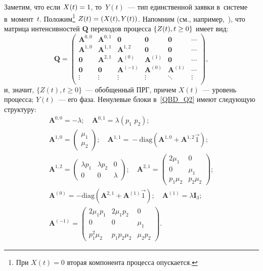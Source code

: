 \begin{multicols}{2}
 Заметим, что если $X(t)\hm=1$, то~$Y(t)$~--- 
тип единственной заявки в~сис\-те\-ме в~момент~$t$. Положим\footnote[1]{При $X(t)=0$ вторая компонента процесса 
опускается.} ${Z}(t)\hm=({X}(t),{Y}(t))$. Напомним
(см., например,~\cite{threel}), что мат\-ри\-ца интенсивностей
$\mathbf{Q}$ переходов процесса $\{{Z}(t), t \hm\ge 0\}$ имеет вид:
\begin{equation}
\mathbf{Q} =
\begin{pmatrix}
\mathbf{A}^{0,0} &  \mathbf{A}^{0,1}  & \mathbf{0} & \mathbf{0} & \mathbf{0}   & \cdots\\
\mathbf{A}^{1,0}  & \mathbf{A}^{1,1} & \mathbf{A}^{1,2}  & \mathbf{0} & \mathbf{0} &    \cdots\\
\mathbf{0} & \mathbf{A}^{2,1}  &  \mathbf{A}^{(0)}  & \mathbf{A}^{(1)} & \mathbf{0}  & \cdots\\
\mathbf{0} & \mathbf{0} & \mathbf{A}^{(-1)} & \mathbf{A}^{(0)} & \mathbf{A}^{(1)}  & \cdots\\
\vdots & \vdots & \vdots& \vdots& \ddots&  \vdots\\
\end{pmatrix},
\label{QBD_Q2}
\end{equation}
 и, значит, $\{{Z}(t), t \ge 0\}$~--- обобщенный ПРГ,
причем ${X}(t)$~--- уровень процесса; ${Y}(t)$~--- его фаза.
Ненулевые блоки в~\eqref{QBD_Q2} имеют сле\-ду\-ющую структуру:
\begin{gather*}
\mathbf{A}^{0,0}=-\lambda; \quad \mathbf{A}^{0,1}=\lambda (p_1 \,\, p_2 );\\
\mathbf{A}^{1,0} =
\begin{pmatrix}
\mu_1 \\
\mu_2
\end{pmatrix};
\quad
\mathbf{A}^{1,1} \!=\!
-\mathrm{diag} \left ( \mathbf{A}^{1,0} \!+\! \mathbf{A}^{1,2} {\vec 1} \right );
\\
\mathbf{A}^{1,2}
=
\begin{pmatrix}
\lambda p_1 & \lambda p_2 & 0\\
0 & 0 & \lambda
\end{pmatrix};
\quad \mathbf{A}^{2,1}=
\begin{pmatrix}
2 \mu_1 & 0\\
0 & \mu_1 \\
p_1 \mu_2 & p_2 \mu_2
\end{pmatrix};
\\
\mathbf{A}^{(0)} =
-\mathrm{diag} \left ( \mathbf{A}^{2,1} \!+\! \mathbf{A}^{(1)} {\vec 1} \right );
\quad
\mathbf{A}^{(1)}=\lambda \mathbf{I}_3;
\\
\mathbf{A}^{(-1)} =
\begin{pmatrix}
2 \mu_1 p_1 & 2 \mu_1 p_2 & 0\\
0 & 0 & \mu_1 \\
p_1^2 \mu_2 & p_1 p_2 \mu_2 & \mu_2 p_2
\end{pmatrix}.
\end{gather*}


\end{multicols}
